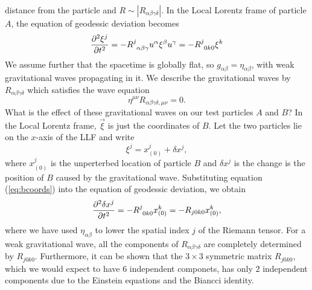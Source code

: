 distance from the particle and $R \sim |R_{\alpha\beta\gamma\delta}|$. In the
Local Lorentz frame of particle $A$, the equation of geodessic deviation
becomes
\begin{equation}
\frac{\partial^2 \xi^{j}}{\partial t^2} = -
\tensor{R}{^j_{\alpha\beta\gamma}}u^\alpha\xi^\beta u^\gamma =
-\tensor{R}{^j_{0k0}} \xi^k
\end{equation}
We assume further that the spacetime is globally flat, so $g_{\alpha\beta} =
\eta_{\alpha\beta}$, with weak gravitational waves propagating in it. We
describe the gravitational waves by $R_{\alpha\beta\gamma\delta}$ which
satisfies the wave equation
\begin{equation}
\eta^{\mu\nu}R_{\alpha\beta\gamma\delta,\mu\nu} = 0.
\end{equation}
What is the effect of these gravitational waves on our test particles $A$ and
$B$? In the Local Lorentz frame, $\vec{\xi}$ is just the coordinates of $B$.
Let the two particles lie on the $x$-axis of the LLF and write
\begin{equation}
\label{eq:bcoords}
\xi^j = x_{(0)}^j + \delta x^j,
\end{equation}
where $x_{(0)}^j$ is the unperterbed location of particle $B$ and $\delta x^j$
is the change is the position of $B$ caused by the gravitational wave.
Substituting equation (\ref{eq:bcoords}) into the equation of geodessic
deviation, we obtain
\begin{equation}
\label{eq:particledev}
\frac{\partial^2 \delta x^j}{\partial t^2} = - \tensor{R}{^j_{0k0}} x_{(0)}^k =
-R_{j0k0} x_{(0)}^k,
\end{equation}
where we have used $\eta_{\alpha\beta}$ to lower the spatial index $j$ of the
Riemann tensor. For a weak gravitational wave, all the components of
$R_{\alpha\beta\gamma\delta}$ are completely determined by $R_{j0k0}$.
Furthermore, it can be shown that the $3\times3$ symmetric matrix $R_{j0k0}$,
which we would expect to have $6$ independent componets, has only $2$
independent components due to the Einstein equations and the Biancci identity.

